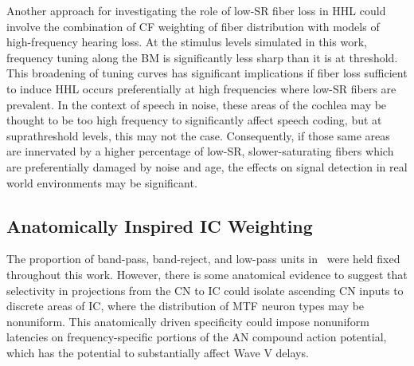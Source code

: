 Another approach for investigating the role of low-SR fiber loss in HHL could involve the combination of CF weighting of fiber distribution with models of high-frequency hearing loss.  At the stimulus levels simulated in this work, frequency tuning along the BM is significantly less sharp than it is at threshold.  This broadening of tuning curves has significant implications if fiber loss sufficient to induce HHL occurs preferentially at high frequencies where low-SR fibers are prevalent.   In the context of speech in noise, these areas of the cochlea may be thought to be too high frequency to significantly affect speech coding, but at suprathreshold levels, this may not the case. Consequently, if those same areas are innervated by a higher percentage of low-SR, slower-saturating fibers which are preferentially damaged by noise and age, the effects on signal detection in real world environments may be significant. 

\subsection{Anatomically Inspired IC Weighting} %
\label{sub:anatomically_inspired_brainstem_adaptation}
The proportion of band-pass, band-reject, and low-pass units in~\cite{Carney2015Speech} were held fixed throughout this work.  However, there is some anatomical evidence to suggest that selectivity in projections from the CN to IC could isolate ascending CN inputs to discrete areas of IC, where the distribution of MTF neuron types may be nonuniform.  This anatomically driven specificity could impose nonuniform latencies on frequency-specific portions of the AN compound action potential, which has the potential to substantially affect Wave V delays. 
